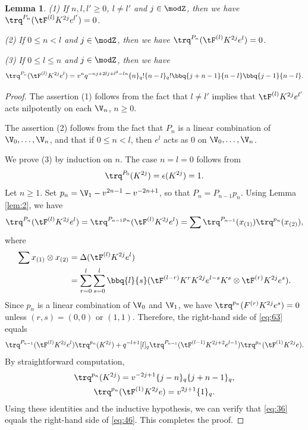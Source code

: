 \documentclass{amsart}
\numberwithin{equation}{section}
\numberwithin{figure}{section}
\theoremstyle{plain}
\newtheorem{lemma}[theorem]{Lemma}
\theoremstyle{definition}
\theoremstyle{remark}
\begin{document}
\begin{lemma}
  \label{lem:6}
  (1) If $n,l,l'\ge 0$, $l\neq l'$ and $j\in \modZ $, then we have
  $\trq^{P_n}(\tF^{(l)}K^{2j}e^{l'})=0$.

  (2) If $0\le n<l$ and $j\in \modZ $, then we have
      $\trq^{P_n}(\tF^{(l)}K^{2j}e^l)=0$.

  (3) If $0\le l\le n$ and $j\in \modZ $, then we have
  \begin{equation}
    \label{eq:46}
    \trq^{P_n}(\tF^{(l)}K^{2j}e^l)
    =v^n q^{-nj+2lj+l^2-ln} \{n\}_q!\{n-l\}_q!
    \bbq{j+n-1}{n-l} \bbq{j-1}{n-l}.
  \end{equation}
\end{lemma}

\begin{proof}
  The assertion (1) follows from the fact that $l\neq l'$ implies that
  $\tF^{(l)}K^{2j}e^{l'}$ acts nilpotently on each $\V_n$, $n\ge 0$.

  The assertion (2) follows from the fact that $P_n$ is a linear
  combination of $\V_0,\ldots,\V_n$, and that if $0\le n<l$, then $e^l$
  acts as $0$ on $\V_0,\ldots,\V_n$.

  We prove (3) by induction on $n$.  The case $n=l=0$ follows from
  \begin{equation*}
    \trq^{P_0}(K^{2j})=\epsilon (K^{2j})=1.
  \end{equation*}
  Let $n\ge 1$.  Set $p_n=\V_1-v^{2n-1}-v^{-2n+1}$, so that
  $P_n=P_{n-1}p_n$.  Using Lemma \ref{lem:2}, we have
  \begin{equation}
    \label{eq:63}
    \trq^{P_n}(\tF^{(l)}K^{2j}e^l)
    =\trq^{P_{n-1}p_n}(\tF^{(l)}K^{2j}e^l)
    =\sum\trq^{P_{n-1}}(x_{(1)})\trq^{p_n}(x_{(2)}),
  \end{equation}
  where
  \begin{equation*}
    \begin{split}
      \sum x_{(1)}\otimes x_{(2)}
      &=\Delta (\tF^{(l)}K^{2j}e^l)\\
      &=\sum_{r=0}^l\sum_{s=0}^l
      \bbq{l}{s}
      (\tF^{(l-r)}K^rK^{2j}e^{l-s}K^s\otimes \tF^{(r)}K^{2j}e^s).
    \end{split}
  \end{equation*}
  Since $p_n$ is a linear combination of $\V_0$ and $\V_1$, we have
  $\trq^{p_n}(F^{(r)}K^{2j}e^s)=0$ unless $(r,s)=(0,0)$ or $(1,1)$.
  Therefore, the right-hand side of \eqref{eq:63} equals
  \begin{equation}
    \label{eq:36}
      \trq^{P_{n-1}}(\tF^{(l)}K^{2j}e^{l})\trq^{p_n}(K^{2j})
       + q^{-l+1}[l]_q
      \trq^{P_{n-1}}(\tF^{(l-1)}K^{2j+2}e^{l-1})\trq^{p_n}(\tF^{(1)}K^{2j}e).
  \end{equation}
  By straightforward computation,
  \begin{gather*}
    \trq^{p_n}(K^{2j}) = v^{-2j+1}\{j-n\}_q\{j+n-1\}_q,\\
    \trq^{p_n}(\tF^{(1)}K^{2j}e) = v^{2j+1}\{1\}_q.
  \end{gather*}
  Using these identities and the inductive hypothesis, we can verify
  that \eqref{eq:36} equals the right-hand side of \eqref{eq:46}.
  This completes the proof.
\end{proof}
\end{document}
